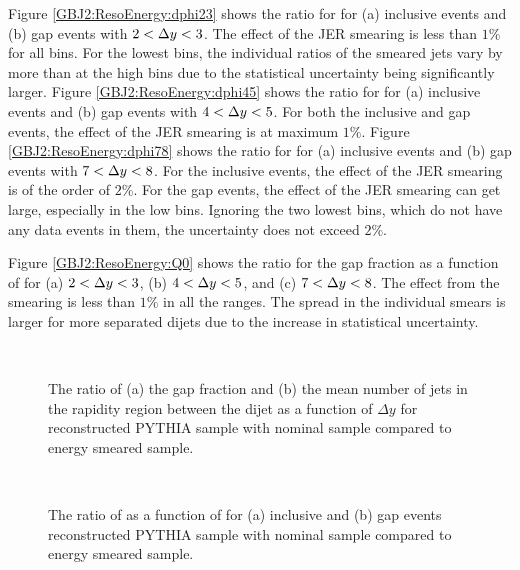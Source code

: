 Figure \ref{GBJ2:ResoEnergy:dphi23} shows the ratio for \dphiDist{} for (a) inclusive events and (b) gap events with  $2<\mbox{$\Delta y$}{}<3$.
The effect of the JER smearing is less than  $1\%$ for all bins.
For the lowest \dphi{} bins, the individual ratios of the smeared jets vary by more than at the high \dphi{} bins due to the statistical uncertainty being significantly larger.
Figure \ref{GBJ2:ResoEnergy:dphi45} shows the ratio for \dphiDist{} for (a) inclusive events and (b) gap events with $4<\mbox{$\Delta y$}{}<5$.
For both the inclusive and gap events, the effect of the JER smearing is at maximum  $1\%$.
Figure \ref{GBJ2:ResoEnergy:dphi78} shows the ratio for \dphiDist{} for (a) inclusive events and (b) gap events with $7<\mbox{$\Delta y$}{}<8$.
For the inclusive events, the effect of the JER smearing is of the order of $2\%$.
For the gap events, the effect of the JER smearing can get large, especially in the low \dphi{} bins. 
Ignoring the two lowest \dphi{} bins, which do not have any data events in them, the uncertainty does not exceed $2\%$.

Figure \ref{GBJ2:ResoEnergy:Q0} shows the ratio for the gap fraction as a function of \qz{} for (a) $2<\mbox{$\Delta y$}{}<3$, (b) $4<\mbox{$\Delta y$}{}<5$, and (c) $7<\mbox{$\Delta y$}{}<8$.
The effect from the smearing is less than $1\%$ in all the ranges.
The spread in the individual smears is larger for more separated dijets due to the increase in statistical uncertainty. 


\begin{figure}
\centering
\mbox{
              \quad
              \quad
                              }
\caption[Uncertainty bands due to the JER uncertainty for gap fraction and mean number of jets]{
The ratio of (a) the gap fraction and (b) the mean number of jets in the rapidity region between the dijet as a function of $\Delta y$ for reconstructed PYTHIA sample with nominal sample compared to energy smeared sample.
\label{GBJ2:ResoEnergy:Inclusive_gap}}
\end{figure}

\begin{figure}
\centering
\mbox{
              \quad
              \quad
                              }
\caption[Uncertainty bands due to the JER uncertainty for \mean{\cosdphi{}}]{
The ratio of \mean{\cosdphi{}} as a function of \dy{} for (a) inclusive and (b) gap events reconstructed PYTHIA sample with nominal sample compared to energy smeared sample.
\label{GBJ2:ResoEnergy:cos}}
\end{figure}

